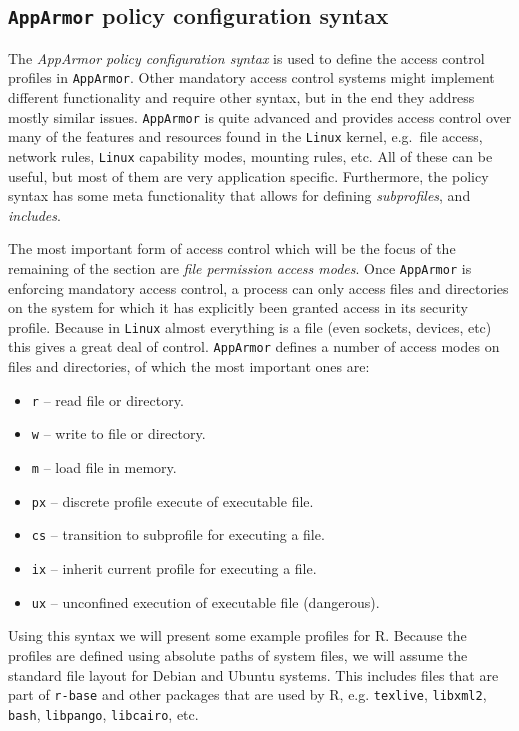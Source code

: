 \documentclass{jss}
\newcommand{\R}{\textsf{R}\xspace}
\newcommand{\AppArmor}{\texttt{AppArmor}\xspace}
\newcommand{\Linux}{\texttt{Linux}\xspace}
\begin{document}
\subsection[AppArmor policy configuration syntax]{\AppArmor policy configuration
syntax}
\label{syntax}

The \emph{AppArmor policy configuration syntax} is used to define the access
control profiles in \AppArmor. Other mandatory access control systems
might implement different functionality and require other syntax, but in the end
they address mostly similar issues. \AppArmor is quite advanced and provides
access control over many of the features and resources found in the \Linux
kernel, e.g.\ file access, network rules, \Linux capability modes, mounting
rules, etc. All of these can be useful, but most of them are very application
specific. Furthermore, the policy syntax has some meta functionality that
allows for defining \emph{subprofiles}, and \emph{includes}.

The most important form of access control which will be the focus of the
remaining of the section are \emph{file permission access modes}. Once \AppArmor
is enforcing mandatory access control, a process can only access files and
directories on the system for which it has explicitly been granted access in
its security profile. Because in \Linux almost everything is a file
(even sockets, devices, etc) this gives a great deal of control. \AppArmor
defines a number of access modes on files and directories, of which the most
important ones are:

\begin{itemize}
  \item[] \texttt{r} -- read file or directory.
  \item[] \texttt{w} -- write to file or directory.
  \item[] \texttt{m} -- load file in memory.
  \item[] \texttt{px} -- discrete profile execute of executable file.
  \item[] \texttt{cs} -- transition to subprofile for executing a file.
  \item[] \texttt{ix} -- inherit current profile for executing a file.
  \item[] \texttt{ux} -- unconfined execution of executable file (dangerous).
\end{itemize}

Using this syntax we will present some example profiles for \R. Because the
profiles are defined using absolute paths of system files, we will assume the
standard file layout for Debian and Ubuntu systems. This includes files that
are part of \texttt{r-base} and other packages that are used by \R, e.g.
\texttt{texlive}, \texttt{libxml2}, \texttt{bash}, \texttt{libpango},
\texttt{libcairo}, etc.
\end{document}
